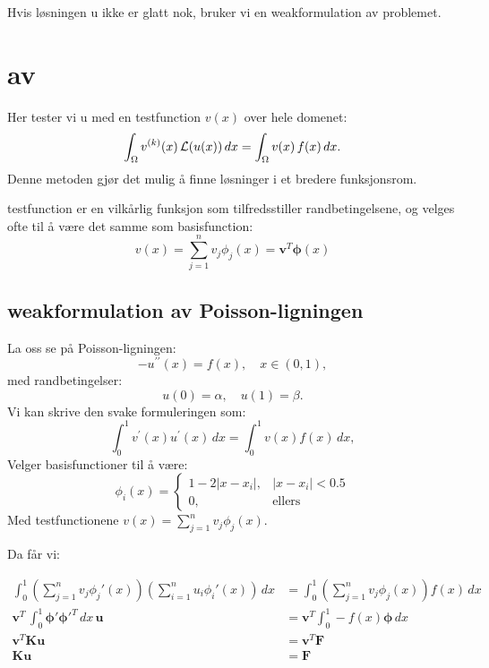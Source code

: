 Hvis løsningen u ikke er glatt nok, bruker vi en \gls{weakformulation} av problemet.

\section{ av }

Her tester vi u med en \gls{testfunction} \(v(x)\) over hele domenet:
\[
  \int_\Omega v^{(k)}(x) \, \mathcal{L}(u(x)) \, dx = \int_\Omega v(x) \, f(x) \, dx.
\]
Denne metoden gjør det mulig å finne løsninger i et bredere funksjonsrom.

\gls{testfunction} er en vilkårlig funksjon som tilfredsstiller randbetingelsene, og velges ofte til å være det samme som \gls{basisfunction}:
\[
  v(x) = \sum_{j=1}^n v_j \phi_j(x) = \symbf{v}^T \symbf{\phi}(x)
\]

\subsection{\gls{weakformulation} av Poisson-ligningen}
La oss se på Poisson-ligningen:
\[
  -u^{\prime\prime}(x) = f(x), \quad x \in (0,1),
\]
med randbetingelser:
\[
  u(0) = \alpha, \quad u(1) = \beta.
\]
Vi kan skrive den svake formuleringen som:
\[
  \int_0^1 v^\prime (x) u^\prime (x) \, dx = \int_0^1 v(x) f(x) \, dx,
\]
Velger \gls{basisfunction}er til å være:
\[
  \phi_i(x) = \begin{cases}
    1 - 2|x - x_i|, & |x - x_i| < 0.5 \\
    0,              & \text{ellers}
  \end{cases}
\]
Med \gls{testfunction}ene \(v(x) = \sum_{j=1}^n v_j \phi_j(x)\).

Da får vi:

\begin{align*}
  \int_0^1 \left( \sum_{j=1}^n v_j \phi_j'(x) \right)
  \left( \sum_{i=1}^n u_i \phi_i'(x) \right) \, dx
                      & =
  \int_0^1 \left( \sum_{j=1}^n v_j \phi_j(x) \right) f(x) \, dx \\
  \symbf{v}^T \, \int_0^1 \symbf{\phi}' \symbf{\phi}'^T \, dx \, \symbf{u}
                      & =
  \symbf{v}^T \int_0^1 - f(x) \symbf{\phi}  \, dx               \\
  \symbf{v}^T \symbf{K} \symbf{u}
                      & =
  \symbf{v}^T \symbf{F}                                         \\
  \symbf{K} \symbf{u} & = \symbf{F}
\end{align*}


